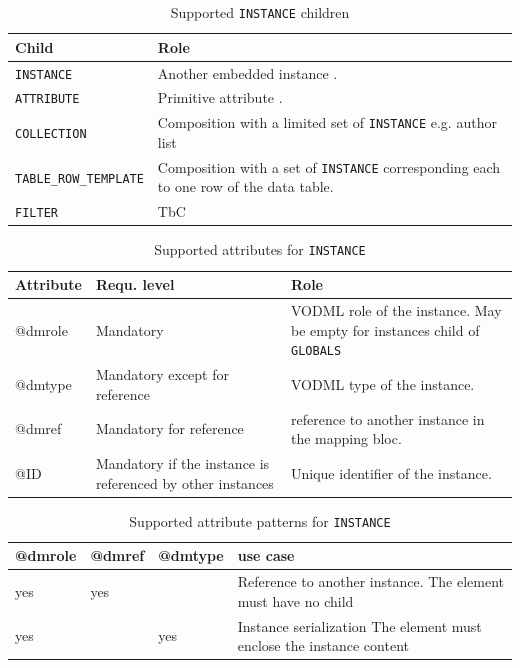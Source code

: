 \documentclass[11pt,a4paper]{ivoa}
\begin{document}
\begin{table}[ht!]
     \begin{tabular}{|p{3cm}|p{7cm}|}
       \hline Child &  Role\\
       \hline  \texttt{INSTANCE}    & Another embedded instance . \\       
       \hline  \texttt{ATTRIBUTE}    & Primitive attribute . \\       
       \hline  \texttt{COLLECTION}    & Composition with a limited set of  \texttt{INSTANCE} e.g. author list\\      
       \hline  \texttt{TABLE\_ROW\_TEMPLATE}    & Composition with a set of  \texttt{INSTANCE} corresponding each to one row of the data table. \\
       \hline  \texttt{FILTER}    & TbC \\
       \hline 
     \end{tabular}
     \caption{Supported  \texttt{INSTANCE} children} 
 \end{table}

\begin{table}[ht!]
     \begin{tabular}{|p{1.5cm}|p{4cm}|p{7cm}|}
       \hline Attribute & Requ. level & Role\\
       \hline  @dmrole   & Mandatory & VODML role of the instance. May be empty for instances child of 
                                      \texttt{GLOBALS}  \\
       \hline  @dmtype  & Mandatory except for reference & VODML type of the instance.   \\
       \hline  @dmref  & Mandatory for reference & reference to another instance in the mapping bloc. \\          
       \hline  @ID  & Mandatory if the instance is referenced by other instances & Unique identifier of the instance. \\
       \hline 
     \end{tabular}
     \caption{Supported attributes for  \texttt{INSTANCE}} 
 \end{table}

\begin{table}[ht!]
\begin{tabular}{|p{1.5cm}|p{1.5cm}|p{1.5cm}|p{5cm}|}
\hline @dmrole & @dmref &  @dmtype &  use case\\
\hline  yes & yes &  & Reference to another instance. The element must have no child  \\
\hline  yes &  & yes  & Instance serialization The element must enclose the instance content  \\
\hline 
\end{tabular}
     \caption{Supported attribute patterns for  \texttt{INSTANCE}} 
 \end{table}
\end{document}
